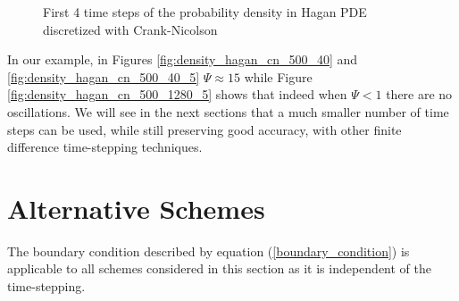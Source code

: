 \documentclass[]{rAMF2e}
\begin{document}
\begin{figure}[htb]
  \begin{center}  
  \end{center}
     \caption{\label{fig:density_hagan_500_40_5} First 4 time steps of the probability density in Hagan PDE discretized with Crank-Nicolson}
\end{figure}

In our example, in Figures \ref{fig:density_hagan_cn_500_40} and \ref{fig:density_hagan_cn_500_40_5} $\Psi \approx 15$ while Figure \ref{fig:density_hagan_cn_500_1280_5} shows that indeed when $\Psi < 1$ there are no oscillations. We will see in the next sections that a much smaller number of time steps can be used, while still preserving good accuracy, with other finite difference time-stepping techniques.

\section{Alternative Schemes}
The boundary condition described by equation (\ref{boundary_condition}) is applicable to all schemes considered in this section as it is independent of the time-stepping.
\end{document}
